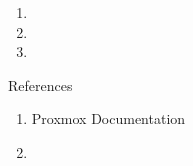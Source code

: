 \documentclass[14pt,compress,usenames,dvipsnames,aspectratio=169]{beamer}
\begin{document}
\begin{frame}{}
    \begin{enumerate}
        \item{} 
        \item{}
        \item{}
    \end{enumerate}
\end{frame}

\begin{frame}{References}
    
    \begin{enumerate}
        \item Proxmox Documentation
        \item 
    \end{enumerate}
    
\end{frame}
\end{document}
